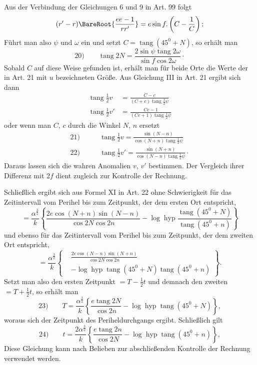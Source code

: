 \par
Aus der Verbindung der Gleichungen 6 und 9 in Art. 99 folgt
\[
(r'-r)\BareRoot{\frac{ee-1}{rr'}}=e\sin f\mathpunct{.}\left(C-\frac1C\right);
\]
\noindent Führt man also $\psi$ und $\omega$ ein und setzt $C=\operatorname{tang}(45^0+N)$, so erhält man
\[
\mathrm{20)}\qquad\operatorname{tang}2N=\frac{2\sin\psi\operatorname{tang}2\omega}{\sin f\cos2\omega}\mathpunct{\cdot}
\]
\noindent Sobald $C$ auf diese Weise gefunden ist, erhält man für beide Orte die Werte der in Art. 21 mit $u$ bezeichneten Größe. Aus Gleichung III in Art. 21 ergibt sich dann
\[
\begin{aligned}
\operatorname{tang}\tfrac12v&=\frac{C-c}{(C+c)\operatorname{tang}\tfrac12\psi}\\[.6em]
\operatorname{tang}\tfrac12v'&=\frac{Cc-1}{(Cc+1)\operatorname{tang}\tfrac12\psi}
\end{aligned}
\]
\noindent oder wenn man $C$, $c$ durch die Winkel $N$, $n$ ersetzt
\[
\begin{aligned}
\mathrm{21)}\qquad&\operatorname{tang}\tfrac12v=\frac{\sin(N-n)}{\cos(N+n)\operatorname{tang}\tfrac12\psi}\\[.6em]
\mathrm{22)}\qquad&\operatorname{tang}\tfrac12v'=\frac{\sin(N+n)}{\cos(N-n)\operatorname{tang}\tfrac12\psi}\mathpunct{\cdot}
\end{aligned}
\]
\noindent Daraus lassen sich die wahren Anomalien $v$, $v'$ bestimmen. Der Vergleich ihrer Differenz mit $2f$ dient zugleich zur Kontrolle der Rechnung.
\par
Schließlich ergibt sich aus Formel XI in Art. 22 ohne Schwierigkeit für das Zeitintervall vom Perihel bis zum Zeitpunkt, der dem ersten Ort entspricht,
\[
=\frac{\alpha^{\frac32}}k\left\{\frac{2e\cos(N+n)\sin(N-n)}{\cos2N\cos2n}-\log\operatorname{hyp}\frac{\operatorname{tang}(45^0+N)}{\operatorname{tang}(45^0+n)}\right\}
\]
\noindent und ebenso für das Zeitintervall vom Perihel bis zum Zeitpunkt, der dem zweiten Ort entspricht,
\[
=\frac{\alpha^{\frac32}}k\left\{\begin{aligned}&\frac{2e\cos(N-n)\sin(N+n)}{\cos2N\cos2n}\\[.5em]&-\log\operatorname{hyp}\operatorname{tang}(45^0+N)\operatorname{tang}(45^0+n)\end{aligned}\right\}.
\]
\noindent Setzt man also den ersten Zeitpunkt $=T-\tfrac12t$ und demnach den zweiten $=T+\tfrac12t$, so erhält man
\[
\mathrm{23)}\qquad T=\frac{\alpha^{\frac32}}k\left\{\frac{e\operatorname{tang}2N}{\cos2n}-\log\operatorname{hyp}\operatorname{tang}(45^0+N)\right\},
\]
\noindent{}woraus sich der Zeitpunkt des Periheldurchgangs ergibt. Schließlich gilt
\[
\mathrm{24)}\qquad t=\frac{2\alpha^{\frac32}}k\left\{\frac{e\operatorname{tang}2n}{\cos2N}-\log\operatorname{hyp}\operatorname{tang}(45^0+n)\right\},
\]
\noindent Diese Gleichung kann nach Belieben zur abschließenden Kontrolle der Rechnung verwendet werden.
